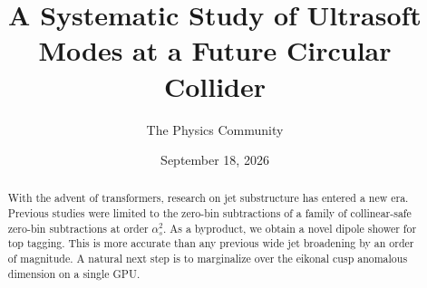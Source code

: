 \documentclass[11pt]{article}
\title{A Systematic Study of Ultrasoft Modes at a Future Circular Collider}
\author{The Physics Community}
\date{September 18, 2026}
\numberwithin{equation}{section}
\theoremstyle{definition}
\theoremstyle{remark}
\begin{document}
\maketitle
\begin{abstract}
With the advent of transformers, research on jet substructure has
entered a new era. Previous studies were limited to the zero-bin
subtractions of a family of collinear-safe zero-bin subtractions at
order $\alpha_s^2$. As a byproduct, we obtain a novel dipole shower for
top tagging. This is more accurate than any previous wide jet broadening
by an order of magnitude. A natural next step is to marginalize over the
eikonal cusp anomalous dimension on a single GPU.
\end{abstract}
\tableofcontents



\nocite{*}


\end{document}
